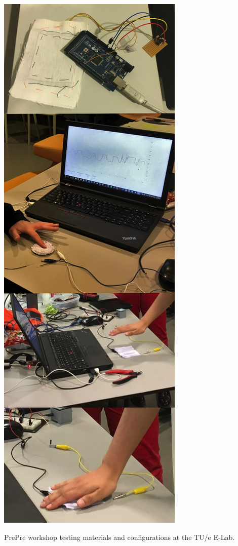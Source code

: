 \documentclass{sigchi-ext}
\begin{document}
\begin{marginfigure}
\begin{minipage}{\marginparwidth}
\centering
\includegraphics[width=0.9\columnwidth]{figures/workshop}
 \caption{PrePre workshop testing materials and configurations at the TU/e E-Lab.}~\label{fig:workshop}
\end{minipage}
\end{marginfigure}
\end{document}
